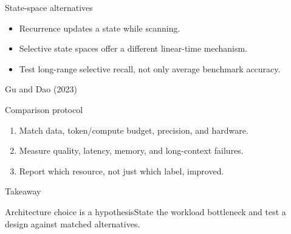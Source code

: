 \documentclass[aspectratio=169,10pt]{beamer}\usetheme{metropolis}
\begin{document}
\begin{frame}{State-space alternatives}\begin{itemize}\item Recurrence updates a state while scanning.\item Selective state spaces offer a different linear-time mechanism.\item Test long-range selective recall, not only average benchmark accuracy.\end{itemize}\vfill\small Gu and Dao (2023)\end{frame}
\begin{frame}{Comparison protocol}\begin{enumerate}\item Match data, token/compute budget, precision, and hardware.\item Measure quality, latency, memory, and long-context failures.\item Report which resource, not just which label, improved.\end{enumerate}\end{frame}
\begin{frame}{Takeaway}\begin{block}{Architecture choice is a hypothesis}State the workload bottleneck and test a design against matched alternatives.\end{block}\end{frame}
\end{document}
